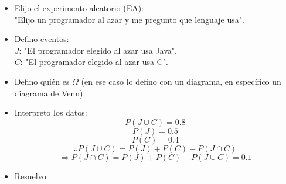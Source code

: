 \documentclass[../main.tex]{subfiles}
\begin{document}
\begin{example*}
    \begin{itemize}
        \item Elijo el experimento aleatorio (EA):\\ "Elijo un programador al azar y me pregunto que lenguaje usa".
        \item Defino eventos:\\
        $J$: "El programador elegido al azar usa Java".\\
        $C$: "El programador elegido al azar usa C".\\
        \item Defino quién es $\Omega$ (en ese caso lo defino con un diagrama, en específico un diagrama de Venn):
            
        \item Interpreto los datos:
            \begin{equation*}
                P(J \cup C) = 0.8
            \end{equation*}
            \begin{equation*}
                P(J) = 0.5
            \end{equation*}
            \begin{equation*}
                P(C) = 0.4
            \end{equation*}
            \begin{equation*}
                \therefore P(J \cup C) = P(J) + P(C) - P(J \cap C)
            \end{equation*}
            \begin{equation*}
                \Rightarrow P(J \cap C) = P(J) + P(C) - P(J \cup C) = 0.1
            \end{equation*}
        \item Resuelvo
            \begin{enumerate}[label=\alph*)]

\end{enumerate}
\end{itemize}
\end{example*}
\end{document}
